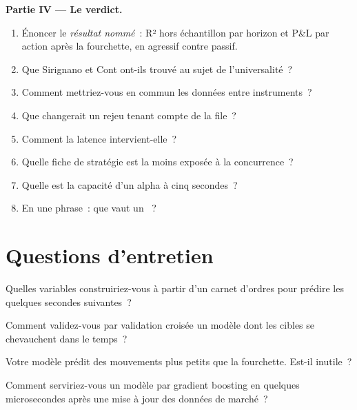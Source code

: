 \begin{problem}
\medskip\noindent\textbf{Partie IV --- Le verdict.}
\begin{enumerate}[resume]
\item Énoncer le \emph{résultat nommé}~: R² hors échantillon par horizon et P\&L par action après la fourchette, en agressif contre passif.
\item Que Sirignano et Cont ont-ils trouvé au sujet de l'universalité~?
\item Comment mettriez-vous en commun les données entre instruments~?
\item Que changerait un rejeu tenant compte de la file~?
\item Comment la latence intervient-elle~?
\item Quelle fiche de stratégie est la moins exposée à la concurrence~?
\item Quelle est la capacité d'un alpha à cinq secondes~?
\item En une phrase~: que vaut un ~?
\end{enumerate}
\end{problem}

\section{Questions d'entretien}

\begin{interviewq}\label{iq:s1:intraday-machine-learned-alphas:1}
Quelles variables construiriez-vous à partir d'un carnet d'ordres pour prédire les quelques secondes suivantes~?
\end{interviewq}

\begin{interviewq}\label{iq:s1:intraday-machine-learned-alphas:2}
Comment validez-vous par validation croisée un modèle dont les cibles se chevauchent dans le temps~?
\end{interviewq}

\begin{interviewq}\label{iq:s1:intraday-machine-learned-alphas:3}
Votre modèle prédit des mouvements plus petits que la fourchette. Est-il inutile~?
\end{interviewq}

\begin{interviewq}\label{iq:s1:intraday-machine-learned-alphas:4}
Comment serviriez-vous un modèle par gradient boosting en quelques microsecondes après une mise à jour des données de marché~?
\end{interviewq}

